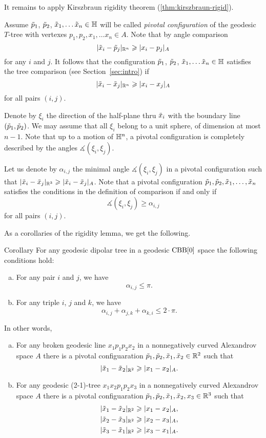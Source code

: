 It remains to apply Kirszbraun rigidity theorem (\ref{thm:kirszbraun-rigid}).
\qeds

Assume $\~p_1$, $\~p_2$, $\~x_1,\dots\~x_n\in \HH$ will be called \emph{pivotal configuration} of the geodesic $T$-tree with vertexes $p_1,p_2,x_1,\dots x_n\in A$.
Note that by angle comparison 
\[|\~x_i-\~p_j|_{\RR^n}\ge |x_i-p_j|_A\]
for any $i$ and $j$.
It follows that the configuration $\~p_1$, $\~p_2$, $\~x_1,\dots\~x_n\in \HH$ satisfies the tree comparison (see Section~\ref{sec:intro}) if 
\[|\~x_i-\~x_j|_{\RR^n}\ge |x_i-x_j|_A\]
for all pairs $(i,j)$.

Denote by $\xi_i$ the direction of the half-plane thru $\~x_i$ with the boundary line $(\~p_1, \~p_2)$.
We may assume that all $\xi_i$ belong to a unit sphere, of dimension at most $n-1$.
Note that up to a motion of $\HH^n$, a pivotal configuration is completely described by the angles $\measuredangle(\xi_i,\xi_j)$.

Let us denote by $\alpha_{i,j}$ the minimal angle $\measuredangle(\xi_i,\xi_j)$ in a pivotal configuration such that $|\~x_i-\~x_j|_{\RR^3}\ge|\~x_i-\~x_j|_A$. 
Note that a pivotal  configuration $\~p_1,\~p_2,\~x_1,\dots,\~x_n$ satisfies the conditions in the definition of comparison if and only if 
\[\measuredangle(\xi_i,\xi_j)\ge \alpha_{i,j}\]
for all pairs $(i,j)$.

As a corollaries of the rigidity lemma, we get the following.

\begin{thm}{Corollary}\label{cor:|x-x|}
For any geodesic dipolar tree  in a geodesic $\CBB[0]$ space the following conditions hold:
\begin{enumerate}[(a)]
\item For any pair $i$ and $j$, we have
\[\alpha_{i,j}\le \pi.\]
\item For any triple $i$, $j$ and $k$,  we have
\[\alpha_{i,j}+\alpha_{j,k}+\alpha_{k,i}\le 2\cdot\pi.\]
\end{enumerate}
In other words, 
\begin{enumerate}[(a)]
\item For any broken geodesic line $x_1p_1p_2x_2$ in a nonnegatively curved Alexandrov space $A$ there is a pivotal configuaration $\~p_1,\~p_2,\~x_1,\~x_2\in \RR^2$ such that 
\[|\~x_1-\~x_2|_{\RR^2}\ge |x_1-x_2|_A.\]
\item For any geodesic (2-1)-tree $x_1x_2p_1p_2x_3$ in a nonnegatively curved Alexandrov space $A$ there is a pivotal configuaration $\~p_1,\~p_2,\~x_1,\~x_2,x_3\in \RR^3$ such that 
\begin{align*}
|\~x_1-\~x_2|_{\RR^2}&\ge |x_1-x_2|_A,
\\
|\~x_2-\~x_3|_{\RR^2}&\ge |x_2-x_3|_A,
\\
|\~x_3-\~x_1|_{\RR^2}&\ge |x_3-x_1|_A.
\end{align*}
\end{enumerate}

\end{thm}

